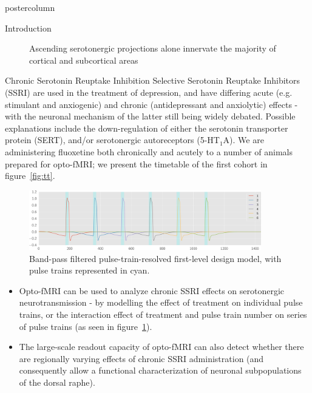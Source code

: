 \documentclass{beamer}
\begin{document}
\begin{frame}
\begin{columns}
\begin{column}{.43\textwidth}
\begin{beamercolorbox}[center]{postercolumn}
\begin{minipage}{.98\textwidth}
{\begin{myblock}{Introduction}
\begin{figure}
\begin{minipage}{0.45\textwidth}
								\caption{Ascending serotonergic projections alone innervate the majority of cortical and subcortical areas \cite{Oegren2008}}
							\end{minipage}
						\end{figure}
					\end{myblock}\vfill
					\begin{myblock}{Chronic Serotonin Reuptake Inhibition}
						Selective Serotonin Reuptake Inhibitors (SSRI) are used in the treatment of depression, and have differing acute (e.g. stimulant and anxiogenic) and chronic (antidepressant and anxiolytic) effects - with the neuronal mechanism of the latter still being widely debated.
						Possible explanations include the down-regulation of either the serotonin transporter protein (SERT), and/or serotonergic autoreceptors (5-HT$_1$A).
						We are administering fluoxetine both chronically and acutely to a number of animals prepared for opto-fMRI; we present the timetable of the first cohort in figure~\ref{fig:tt}.
						\vspace{0.5em}
						\begin{figure}
							\begin{minipage}{0.94\textwidth}
								\centering\includegraphics[width=0.9\textwidth]{img/dm.png}
								\caption{Band-pass filtered pulse-train-resolved first-level design model, with pulse trains represented in cyan.}
								\label{fig:stim}
							\end{minipage}
						\end{figure}
						\begin{itemize}
							\item Opto-fMRI can be used to analyze chronic SSRI effects on serotonergic neurotransmission - by modelling the effect of treatment on individual pulse trains, or the interaction effect of treatment and pulse train number on series of pulse trains (as seen in figure~\ref{fig:stim}).
						 	\item The large-scale readout capacity of opto-fMRI can also detect whether there are regionally varying effects of chronic SSRI administration (and consequently allow a functional characterization of neuronal subpopulations of the dorsal raphe).

\end{itemize}
\end{myblock}}
\end{minipage}
\end{beamercolorbox}
\end{column}
\end{columns}
\end{frame}
\end{document}
